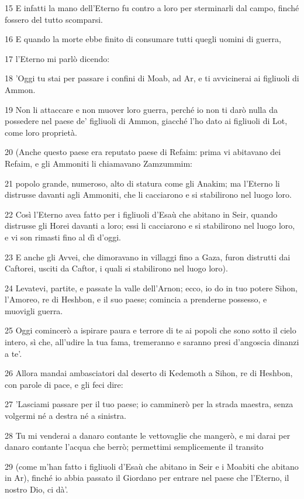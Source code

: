 \par 15 E infatti la mano dell'Eterno fu contro a loro per sterminarli dal campo, finché fossero del tutto scomparsi.
\par 16 E quando la morte ebbe finito di consumare tutti quegli uomini di guerra,
\par 17 l'Eterno mi parlò dicendo:
\par 18 'Oggi tu stai per passare i confini di Moab, ad Ar, e ti avvicinerai ai figliuoli di Ammon.
\par 19 Non li attaccare e non muover loro guerra, perché io non ti darò nulla da possedere nel paese de' figliuoli di Ammon, giacché l'ho dato ai figliuoli di Lot, come loro proprietà.
\par 20 (Anche questo paese era reputato paese di Refaim: prima vi abitavano dei Refaim, e gli Ammoniti li chiamavano Zamzummim:
\par 21 popolo grande, numeroso, alto di statura come gli Anakim; ma l'Eterno li distrusse davanti agli Ammoniti, che li cacciarono e si stabilirono nel luogo loro.
\par 22 Così l'Eterno avea fatto per i figliuoli d'Esaù che abitano in Seir, quando distrusse gli Horei davanti a loro; essi li cacciarono e si stabilirono nel luogo loro, e vi son rimasti fino al dì d'oggi.
\par 23 E anche gli Avvei, che dimoravano in villaggi fino a Gaza, furon distrutti dai Caftorei, usciti da Caftor, i quali si stabilirono nel luogo loro).
\par 24 Levatevi, partite, e passate la valle dell'Arnon; ecco, io do in tuo potere Sihon, l'Amoreo, re di Heshbon, e il suo paese; comincia a prenderne possesso, e muovigli guerra.
\par 25 Oggi comincerò a ispirare paura e terrore di te ai popoli che sono sotto il cielo intero, sì che, all'udire la tua fama, tremeranno e saranno presi d'angoscia dinanzi a te'.
\par 26 Allora mandai ambasciatori dal deserto di Kedemoth a Sihon, re di Heshbon, con parole di pace, e gli feci dire:
\par 27 'Lasciami passare per il tuo paese; io camminerò per la strada maestra, senza volgermi né a destra né a sinistra.
\par 28 Tu mi venderai a danaro contante le vettovaglie che mangerò, e mi darai per danaro contante l'acqua che berrò; permettimi semplicemente il transito
\par 29 (come m'han fatto i figliuoli d'Esaù che abitano in Seir e i Moabiti che abitano in Ar), finché io abbia passato il Giordano per entrare nel paese che l'Eterno, il nostro Dio, ci dà'.
